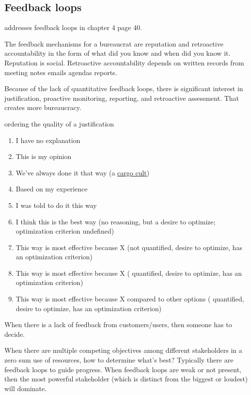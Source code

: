 \subsection{Feedback loops}

\cite{1983_Lipsky} addresses feedback loops in chapter 4 page 40.

The feedback mechanisms for a bureaucrat are reputation and retroactive accountability in the form of what did you know and when did you know it.
Reputation is social.
Retroactive accountability depends on written records from meeting notes emails agendas reports.


Because of the lack of quantitative feedback loops, there is significant interest in justification, proactive monitoring, reporting, and retroactive assessment. That creates more bureaucracy.


ordering the quality of a justification
\begin{enumerate}
    \item I have no explanation
    \item This is my opinion
    \item We've always done it that way (a \href{https://en.wikipedia.org/wiki/Cargo_cult}{cargo cult})
    \item Based on my experience
    \item I was told to do it this way
    \item I think this is the best way (no reasoning, but a desire to optimize; optimization criterion undefined)
    \item This way is most effective because X (not quantified, desire to optimize, has an optimization criterion)
    \item This way is most effective because X ( quantified, desire to optimize, has an optimization criterion)
    \item This way is most effective because X compared to other options ( quantified, desire to optimize, has an optimization criterion)
\end{enumerate}


When there is a lack of feedback from customers/users, then someone has to decide.


When there are multiple competing objectives among different stakeholders in a zero sum use of resources, how to determine what's best? Typically there are feedback loops to guide progress. When feedback loops are weak or not present, then the most powerful stakeholder (which is distinct from the biggest or loudest) will dominate. 

